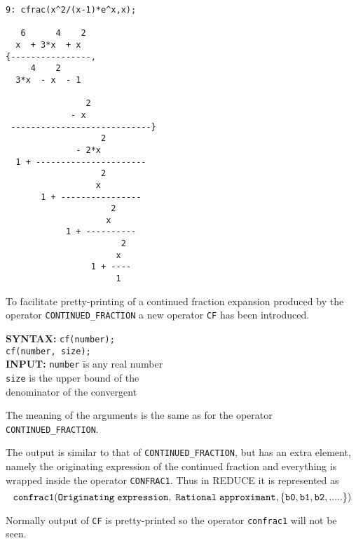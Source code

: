 \begin{verbatim}
9: cfrac(x^2/(x-1)*e^x,x);

   6      4    2
  x  + 3*x  + x
{----------------,
     4    2
  3*x  - x  - 1

                2
             - x
 ----------------------------}
                   2
              - 2*x
  1 + ----------------------
                   2
                  x
       1 + ----------------
                     2
                    x
            1 + ----------
                       2
                      x
                 1 + ----
                      1

\end{verbatim}

To facilitate pretty-printing of a continued fraction expansion produced
by the operator
\texttt{CONTINUED\_FRACTION} a new operator \texttt{CF} has been
introduced.

\begin{tabbing}
{\bf SYNTAX:} \hspace{5mm} 
\= {\tt cf(number);}\\
\> {\tt cf(number, size);}\\ 

{\bf INPUT:}
\> {\tt number} \hspace{3mm} \= is any real number\\
\> {\tt size}              \> is the upper bound of the \\ 
\>                           \> denominator of the convergent \\ 
\end{tabbing}
The meaning of the arguments is the same as for the operator
\texttt{CONTINUED\_FRACTION}.

The output is similar to that of \texttt{CONTINUED\_FRACTION}, but
has an extra element, namely the originating expression of the
continued fraction and everything is wrapped inside the operator
\texttt{CONFRAC1}. Thus in {\small REDUCE} it is represented as
\[{\tt
  confrac1({\sl Originating\hspace{1mm} expression,\hspace{1mm}
            Rational\hspace{1mm} approximant},
                \{b0, b1, b2,.....\})
}\]

Normally output of \texttt{CF} is pretty-printed so the operator
\texttt{confrac1} will not be seen.

